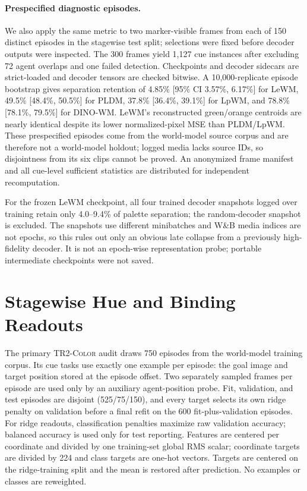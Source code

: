 \documentclass{article}
\newcommand{\trtwo}{\textsc{TR2-Color}}
\begin{document}
\paragraph{Prespecified diagnostic episodes.}
We also apply the same metric to two marker-visible frames from each of 150
distinct episodes in the stagewise test split; selections were fixed before
decoder outputs were inspected.  The 300 frames
yield 1,127 cue instances after excluding 72 agent overlaps and one failed
detection.  Checkpoints and decoder sidecars are strict-loaded and decoder
tensors are checked bitwise.  A 10,000-replicate episode bootstrap gives
separation retention of 4.85\% [95\% CI 3.57\%, 6.17\%] for LeWM,
49.5\% [48.4\%, 50.5\%] for PLDM, 37.8\% [36.4\%, 39.1\%] for LpWM, and
78.8\% [78.1\%, 79.5\%] for DINO-WM.
LeWM's reconstructed green/orange centroids are nearly identical despite its
lower normalized-pixel MSE than PLDM/LpWM.  These prespecified episodes come
from the world-model source corpus and are therefore not a world-model
holdout; logged media lacks source IDs, so disjointness from its six clips
cannot be proved.  An anonymized frame manifest and all cue-level sufficient
statistics are distributed for independent recomputation.

For the frozen LeWM checkpoint, all four trained decoder snapshots logged over
training retain only 4.0--9.4\% of palette separation; the random-decoder
snapshot is excluded.  The snapshots use different minibatches and W\&B media
indices are not epochs, so this rules out only an obvious late collapse from a
previously high-fidelity decoder.  It is not an epoch-wise representation
probe; portable intermediate checkpoints were not saved.

\section{Stagewise Hue and Binding Readouts}

The primary \trtwo{} audit draws 750 episodes from the world-model training
corpus.  Its cue tasks use exactly one example per episode: the goal image and
target position stored at the episode offset.  Two separately sampled frames
per episode are used only by an auxiliary agent-position probe.  Fit,
validation, and test episodes are disjoint (525/75/150), and every target
selects its own ridge penalty on validation before a final refit on the 600
fit-plus-validation episodes.  For ridge readouts, classification penalties maximize raw validation accuracy;
balanced accuracy is used only for test reporting.  Features are centered per
coordinate and divided by one training-set global RMS scalar; coordinate
targets are divided by 224 and class targets are one-hot vectors.  Targets are
centered on the ridge-training split and the mean is restored after prediction.
No examples or classes are reweighted.
\end{document}
